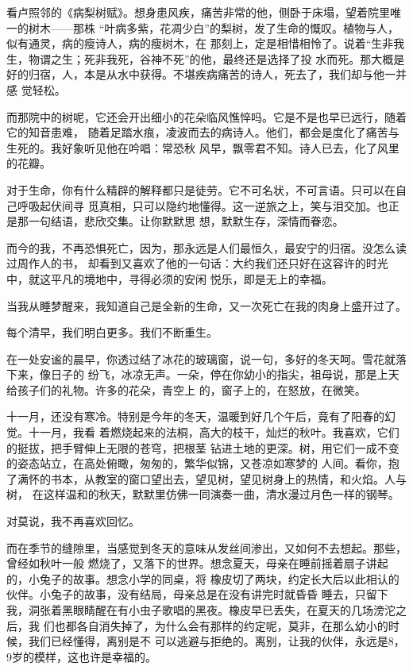 \documentclass[12pt,a4paper]{article}
\begin{document}
		看卢照邻的《病梨树赋》。想身患风疾，痛苦非常的他，侧卧于床塌，望着院里唯一的树木——那株
	“叶病多紫，花凋少白”的梨树，发了生命的慨叹。植物与人，似有通灵，病的瘦诗人，病的瘦树木，在
	那刻上，定是相惜相怜了。说着“生非我生，物谓之生；死非我死，谷神不死”的他，最终还是选择了投
	水而死。那大概是好的归宿，人，本是从水中获得。不堪疾病痛苦的诗人，死去了，我们却与他一并感
	觉轻松。

		而那院中的树呢，它还会开出细小的花朵临风憔悴吗。它是不是也早已远行，随着它的知音患难，
	随着足踏水痕，凌波而去的病诗人。他们，都会是度化了痛苦与生死的。我好象听见他在吟唱：常恐秋
	风早，飘零君不知。诗人已去，化了风里的花瓣。

		对于生命，你有什么精辟的解释都只是徒劳。它不可名状，不可言语。只可以在自己呼吸起伏间寻
	觅真相，只可以隐约地懂得。这一逆旅之上，笑与泪交加。也正是那一句结语，悲欣交集。让你默默思
	想，默默生存，深情而眷恋。

		而今的我，不再恐惧死亡，因为，那永远是人们最恒久，最安宁的归宿。没怎么读过周作人的书，
	却看到又喜欢了他的一句话：大约我们还只好在这容许的时光中，就这平凡的境地中，寻得必须的安闲
	悦乐，即是无上的幸福。

		当我从睡梦醒来，我知道自己是全新的生命，又一次死亡在我的肉身上盛开过了。

		每个清早，我们明白更多。我们不断重生。

	\endwriting



		在一处安谧的晨早，你透过结了冰花的玻璃窗，说一句，多好的冬天呵。雪花就落下来，像日子的
	纷飞，冰凉无声。一朵，停在你幼小的指尖，祖母说，那是上天给孩子们的礼物。许多的花朵，青空上
	的，窗子上的，在怒放，在微笑。


		十一月，还没有寒冷。特别是今年的冬天，温暖到好几个午后，竟有了阳春的幻觉。十一月，我看
	着燃烧起来的法桐，高大的枝干，灿烂的秋叶。我喜欢，它们的挺拔，把手臂伸上无限的苍穹，把根茎
	钻进土地的更深。树，用它们一成不变的姿态站立，在高处俯瞰，匆匆的，繁华似锦，又苍凉如寒梦的
	人间。看你，抱了满怀的书本，从教室的窗口望出去，望见树，望见树身上的热情，和火焰。人与树，
	在这样温和的秋天，默默里仿佛一同演奏一曲，清水漫过月色一样的钢琴。


		对莫说，我不再喜欢回忆。

		而在季节的缝隙里，当感觉到冬天的意味从发丝间渗出，又如何不去想起。那些，曾经如秋叶一般
	燃烧了，又落下的世界。想念夏天，母亲在睡前摇着扇子讲起的，小兔子的故事。想念小学的同桌，将
	橡皮切了两块，约定长大后以此相认的伙伴。小兔子的故事，没有结局，母亲总是在没有讲完时就昏昏
	睡去，只留下我，洞张着黑眼睛醒在有小虫子歌唱的黑夜。橡皮早已丢失，在夏天的几场滂沱之后，我
	们也都各自消失掉了，为什么会有那样的约定呢，莫非，在那么幼小的时候，我们已经懂得，离别是不
	可以逃避与拒绝的。离别，让我的伙伴，永远是8，9岁的模样，这也许是幸福的。
\end{document}
